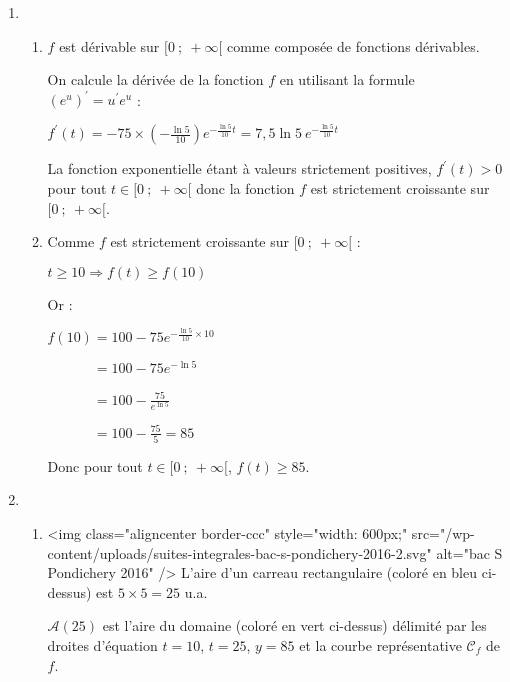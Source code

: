 \begin{enumerate}
     \item
     \begin{enumerate}
          \item
          $f$ est dérivable sur $[0~;~+ \infty[$ comme composée de fonctions dérivables.
          \par
          On calcule la dérivée de la fonction $f$ en utilisant la formule $(e^u)^{\prime}=u^{\prime}e^u$ :
          \par
          $f^{\prime}(t)=-75 \times \left(-\frac{\ln 5}{10} \right){e}^{-\frac{\ln 5}{10}t}$$=7,5\ln5\ {e}^{-\frac{\ln 5}{10}t} $
          \par
          La fonction exponentielle étant à valeurs strictement positives, $f^{\prime}(t)  > 0$ pour tout $t \in [0~;~+ \infty[$ donc la fonction $f$ est strictement croissante sur $[0~;~+ \infty[$.
          \item
          Comme $f$ est strictement croissante sur $[0~;~+ \infty[$ :
          \par
          $t \geqslant 10 \Rightarrow f(t) \geqslant f(10)$
          \par
          Or :
          \par
          $f(10)=100-75{e}^{- \frac{\ln 5}{10} \times 10}$
          \par
          $\phantom{f(10)}=100-75{e}^{-\ln 5}$
          \par
          $\phantom{f(10)}=100-\frac{75}{{e}^{\ln 5}}$
          \par
          $\phantom{f(10)}=100-\frac{75}{5}=85$
          \par
          Donc pour tout $t \in [0~;~+ \infty[$, $f(t) \geqslant 85$.
     \end{enumerate}
     \item
     \begin{enumerate}
          \item
\begin{center}
\end{center}
          <img class="aligncenter border-ccc" style="width: 600px;" src="/wp-content/uploads/suites-integrales-bac-s-pondichery-2016-2.svg" alt="bac S Pondichery 2016" />
          L'aire d'un carreau rectangulaire (coloré en bleu ci-dessus) est $5 \times 5 = 25$ u.a.
          \par
          $\mathcal{A}(25)$ est l'aire du domaine (coloré en vert ci-dessus) délimité par les droites d'équation $t = 10$, $t = 25$, $y = 85$ et la courbe représentative $\mathscr{C}_f$ de $f$.

\end{enumerate}
\end{enumerate}
